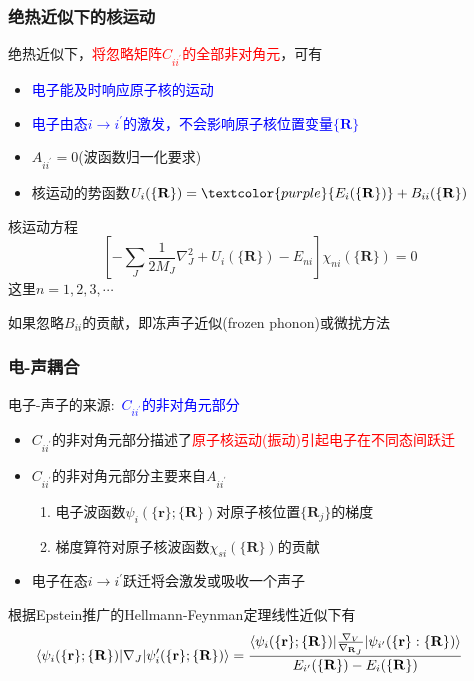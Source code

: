 \frame
{
	\frametitle{绝热近似下的核运动}
	绝热近似下，\textcolor{red}{将忽略矩阵$C_{ii^{\prime}}$的全部非对角元}，可有
	\begin{itemize}
		\item \textcolor{blue}{电子能及时响应原子核的运动}
		\item \textcolor{blue}{电子由态$i\rightarrow i^{\prime}$的激发，不会影响原子核位置变量${\{\mathbf{R}\}}$}
		\item $A_{ii^{\prime}}=0$(波函数归一化要求)
		\item 核运动的势函数$U_i(\{\mathbf{R}\})=\textcolor{purple}{E_i(\{\mathbf{R}\})}+B_{ii}(\{\mathbf{R}\})$
	\end{itemize}
	核运动方程
	\begin{displaymath}
		\left[ -\sum_J\frac1{2M_J}\nabla_J^2+U_i(\{\mathbf{R}\})-E_{ni} \right]\chi_{ni}(\{\mathbf{R}\})=0
	\end{displaymath}
这里$n=1,2,3,\cdots$

如果忽略$B_{ii}$的贡献，即冻声子近似(\textrm{frozen phonon})或微扰方法
}

\frame
{
	\frametitle{电-声耦合}
	电子-声子的来源:~\textcolor{blue}{$C_{ii^{\prime}}$的非对角元部分}
	\begin{itemize}
		\item $C_{ii^{\prime}}$的非对角元部分描述了\textcolor{red}{原子核运动(振动)引起电子在不同态间跃迁}
		\item $C_{ii^{\prime}}$的非对角元部分主要来自$A_{ii^{\prime}}$
			\begin{enumerate}
\setlength{\itemsep}{7pt}
				\item 电子波函数$\psi_i(\{\mathbf{r}\};\{\mathbf{R}\})$对原子核位置$\{\mathbf{R}_j\}$的梯度
				\item 梯度算符对原子核波函数$\chi_{si}(\{\mathbf{R}\})$的贡献
			\end{enumerate}
		\item 电子在态$i\rightarrow i^{\prime}$跃迁将会激发或吸收一个声子
	\end{itemize}
	根据\textrm{Epstein}推广的\textrm{Hellmann-Feynman}定理线性近似下有
	\begin{displaymath}
		\hspace*{-15pt}
		\langle\psi_i(\{\mathbf{r}\};\{\mathbf{R}\})|\nabla_J|\psi_i^{\prime}(\{\mathbf{r}\};\{\mathbf{R}\})\rangle=\frac{\langle\psi_i(\{\mathbf{r}\};\{\mathbf{R}\})|\tfrac{\nabla_V}{\nabla_{\mathbf{R}_J}}|\psi_{i^{\prime}}(\{\mathbf{r}\}:\{\mathbf{R}\})\rangle}{E_{i^{\prime}}(\{\mathbf{R}\})-E_i(\{\mathbf{R}\})}
	\end{displaymath}
}

